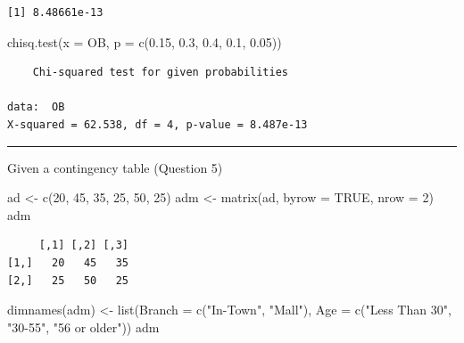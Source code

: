 \documentclass[
]{article}
\newenvironment{Shaded}{\begin{snugshade}}{\end{snugshade}}
\newcommand{\AttributeTok}[1]{\textcolor[rgb]{0.77,0.63,0.00}{#1}}
\newcommand{\ConstantTok}[1]{\textcolor[rgb]{0.00,0.00,0.00}{#1}}
\newcommand{\DecValTok}[1]{\textcolor[rgb]{0.00,0.00,0.81}{#1}}
\newcommand{\FloatTok}[1]{\textcolor[rgb]{0.00,0.00,0.81}{#1}}
\newcommand{\FunctionTok}[1]{\textcolor[rgb]{0.00,0.00,0.00}{#1}}
\newcommand{\NormalTok}[1]{#1}
\newcommand{\OtherTok}[1]{\textcolor[rgb]{0.56,0.35,0.01}{#1}}
\newcommand{\StringTok}[1]{\textcolor[rgb]{0.31,0.60,0.02}{#1}}
\begin{document}
\begin{verbatim}
[1] 8.48661e-13
\end{verbatim}

\begin{Shaded}
\begin{Highlighting}[]
\FunctionTok{chisq.test}\NormalTok{(}\AttributeTok{x =}\NormalTok{ OB, }\AttributeTok{p =} \FunctionTok{c}\NormalTok{(}\FloatTok{0.15}\NormalTok{, }\FloatTok{0.3}\NormalTok{, }\FloatTok{0.4}\NormalTok{, }\FloatTok{0.1}\NormalTok{, }\FloatTok{0.05}\NormalTok{))}
\end{Highlighting}
\end{Shaded}

\begin{verbatim}
    Chi-squared test for given probabilities

data:  OB
X-squared = 62.538, df = 4, p-value = 8.487e-13
\end{verbatim}

\begin{center}\rule{0.5\linewidth}{0.5pt}\end{center}

Given a contingency table (Question 5)

\begin{Shaded}
\begin{Highlighting}[]
\NormalTok{ad }\OtherTok{\textless{}{-}} \FunctionTok{c}\NormalTok{(}\DecValTok{20}\NormalTok{, }\DecValTok{45}\NormalTok{, }\DecValTok{35}\NormalTok{, }\DecValTok{25}\NormalTok{, }\DecValTok{50}\NormalTok{, }\DecValTok{25}\NormalTok{)}
\NormalTok{adm }\OtherTok{\textless{}{-}} \FunctionTok{matrix}\NormalTok{(ad, }\AttributeTok{byrow =} \ConstantTok{TRUE}\NormalTok{, }\AttributeTok{nrow =} \DecValTok{2}\NormalTok{)}
\NormalTok{adm}
\end{Highlighting}
\end{Shaded}

\begin{verbatim}
     [,1] [,2] [,3]
[1,]   20   45   35
[2,]   25   50   25
\end{verbatim}

\begin{Shaded}
\begin{Highlighting}[]
\FunctionTok{dimnames}\NormalTok{(adm) }\OtherTok{\textless{}{-}} \FunctionTok{list}\NormalTok{(}\AttributeTok{Branch =} \FunctionTok{c}\NormalTok{(}\StringTok{"In{-}Town"}\NormalTok{, }\StringTok{"Mall"}\NormalTok{), }\AttributeTok{Age =} \FunctionTok{c}\NormalTok{(}\StringTok{"Less Than 30"}\NormalTok{, }\StringTok{"30{-}55"}\NormalTok{, }\StringTok{"56 or older"}\NormalTok{))}
\NormalTok{adm}
\end{Highlighting}
\end{Shaded}
\end{document}
